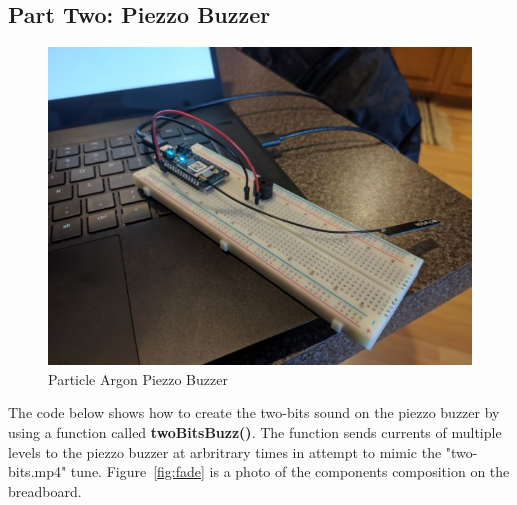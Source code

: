 \documentclass{article}
\begin{document}
\subsection{Part Two: Piezzo Buzzer}
\begin{figure}[H]
\center
\includegraphics[width=\textwidth]{images/buzzer.jpeg}
\caption{Particle Argon Piezzo Buzzer}
\label{fig:buzzer}
\end{figure}

The code below shows how to create the two-bits sound on the piezzo buzzer by using a function called \textbf{twoBitsBuzz()}. The function sends currents of multiple levels to the piezzo buzzer at arbritrary times in attempt to mimic the "two-bits.mp4" tune. Figure~\ref{fig:fade} is a photo of the components composition on the breadboard.

\begin{minipage}[c]{\textwidth}

\end{minipage}
\end{document}
